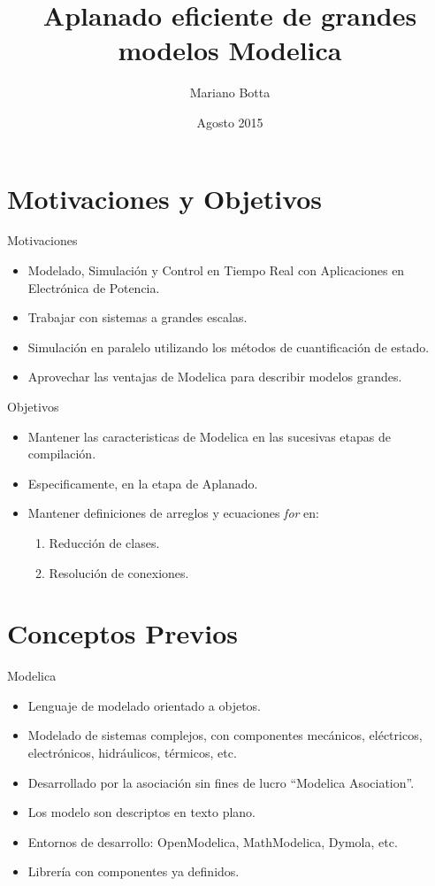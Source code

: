 \documentclass[aspectratio=169,10pt]{beamer}
\title{Aplanado eficiente de grandes modelos Modelica}
\author[M.Botta] {Mariano Botta }
\institute[UNR] %
{ FCEIA, UNR }
\date {Agosto 2015}
\begin{document}
\begin{frame}
  \titlepage
\end{frame}

 
\section{Motivaciones y Objetivos}  

\begin{frame}{Motivaciones}
    \begin{itemize}
     \item Modelado, Simulación y Control en Tiempo Real con Aplicaciones en Electrónica de Potencia.
     \item Trabajar con sistemas a grandes escalas.
     \item Simulación en paralelo utilizando los métodos de cuantificación de estado.       
     \item Aprovechar las ventajas de Modelica para describir modelos grandes.
    \end{itemize}
\end{frame}

\begin{frame}{Objetivos}
    \begin{itemize}
     \item Mantener las caracteristicas de Modelica en las sucesivas etapas de compilación.
     \item Especificamente, en la etapa de Aplanado.
     \item Mantener definiciones de arreglos y ecuaciones \textit{for} en:
        \begin{enumerate}
            \item Reducción de clases.
            \item Resolución de conexiones.
        \end{enumerate}
    \end{itemize}
\end{frame}

\section{Conceptos Previos}

\begin{frame}{Modelica} 
    \begin{itemize}
        \item Lenguaje de modelado orientado a objetos.
        \item Modelado de sistemas complejos, con componentes mecánicos, eléctricos, electrónicos, hidráulicos, térmicos, etc.     
        \item Desarrollado por la asociación sin fines de lucro ``Modelica Asociation''.        
        \item Los modelo son descriptos en texto plano.        
        \item Entornos de desarrollo: OpenModelica, MathModelica, Dymola, etc.
        \item Librería con componentes ya definidos.
    \end{itemize}
\end{frame}
 
\end{document}
